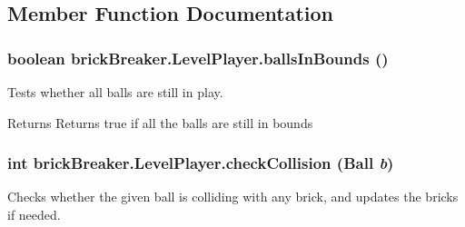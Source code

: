 \subsection{Member Function Documentation}
\hypertarget{classbrick_breaker_1_1_level_player_aa5069116c7e903a1cf8d6663260905b2}{
\subsubsection[{ballsInBounds}]{\setlength{\rightskip}{0pt plus 5cm}boolean brickBreaker.LevelPlayer.ballsInBounds ()}}
\label{classbrick_breaker_1_1_level_player_aa5069116c7e903a1cf8d6663260905b2}
Tests whether all balls are still in play. \begin{DoxyReturn}{Returns}
Returns true if all the balls are still in bounds 
\end{DoxyReturn}
\hypertarget{classbrick_breaker_1_1_level_player_a0faa4b97a3ae3d8f473a5b70de9ab45b}{
\subsubsection[{checkCollision}]{\setlength{\rightskip}{0pt plus 5cm}int brickBreaker.LevelPlayer.checkCollision ({\bf Ball} {\em b})}}
\label{classbrick_breaker_1_1_level_player_a0faa4b97a3ae3d8f473a5b70de9ab45b}
Checks whether the given ball is colliding with any brick, and updates the bricks if needed.



